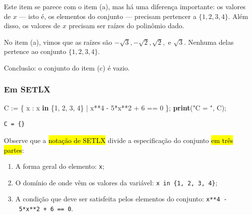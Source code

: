 \documentclass[
  letterpaper,
  DIV=11,
  numbers=noendperiod]{scrreprt}
\newenvironment{Shaded}{\begin{snugshade}}{\end{snugshade}}
\newcommand{\DecValTok}[1]{\textcolor[rgb]{0.00,0.00,0.81}{#1}}
\newcommand{\KeywordTok}[1]{\textcolor[rgb]{0.13,0.29,0.53}{\textbf{#1}}}
\newcommand{\NormalTok}[1]{#1}
\newcommand{\StringTok}[1]{\textcolor[rgb]{0.31,0.60,0.02}{#1}}
\providecommand{\tightlist}{%
  \setlength{\itemsep}{0pt}\setlength{\parskip}{0pt}}\usepackage{longtable,booktabs,array}
\begin{document}
\begin{tcolorbox}[enhanced jigsaw, left=2mm, titlerule=0mm, colbacktitle=quarto-callout-important-color!10!white, title={Resposta (c)}, arc=.35mm, opacityback=0, bottomrule=.15mm, breakable, toprule=.15mm, colback=white, coltitle=black, bottomtitle=1mm, rightrule=.15mm, toptitle=1mm, leftrule=.75mm, colframe=quarto-callout-important-color-frame, opacitybacktitle=0.6]

Este item se parece com o item (a), mas há uma diferença importante: os
valores de $x$ --- isto é, os elementos do conjunto --- precisam
pertencer a $\{ 1, 2, 3, 4 \}$. Além disso, os valores de $x$ precisam
ser raízes do polinômio dado.

No item (a), vimos que as raízes são
$-\sqrt3, -\sqrt2, \sqrt2, \text{ e } \sqrt3$. Nenhuma delas pertence ao
conjunto $\{ 1, 2, 3, 4 \}$.

Conclusão: o conjunto do item (c) é vazio.

\subsubsection*{Em SETLX}\label{em-setlx-1}

\begin{Shaded}
\begin{Highlighting}[]
\NormalTok{C := \{ x : x }\KeywordTok{in}\NormalTok{ \{}\DecValTok{1}\NormalTok{, }\DecValTok{2}\NormalTok{, }\DecValTok{3}\NormalTok{, }\DecValTok{4}\NormalTok{\} | x**}\DecValTok{4}\NormalTok{ {-} }\DecValTok{5}\NormalTok{*x**}\DecValTok{2}\NormalTok{ + }\DecValTok{6}\NormalTok{ == }\DecValTok{0}\NormalTok{ \};}
\KeywordTok{print}\NormalTok{(}\StringTok{"C = "}\NormalTok{, C);}
\end{Highlighting}
\end{Shaded}

\begin{verbatim}
C = {}
\end{verbatim}

Observe que a {\hl{notação de SETLX}} divide a especificação do conjunto
{\hl{em três partes}}:

\begin{enumerate}
\def\labelenumi{\arabic{enumi}.}
\tightlist
\item
  A forma geral do elemento: \texttt{x};
\item
  O domínio de onde vêm os valores da variável:
  \texttt{x\ in\ \{1,\ 2,\ 3,\ 4\}};
\item
  A condição que deve ser satisfeita pelos elementos do conjunto:
  \texttt{x**4\ -\ 5*x**2\ +\ 6\ ==\ 0}.
\end{enumerate}


\end{tcolorbox}
\end{document}
